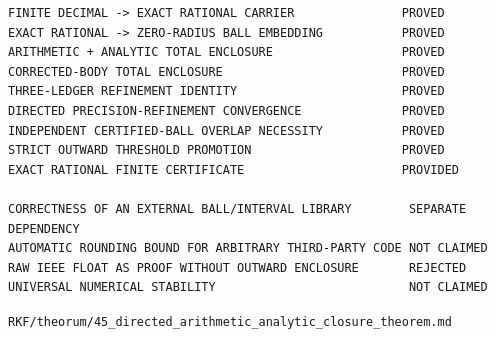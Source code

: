 \begin{verbatim}
FINITE DECIMAL -> EXACT RATIONAL CARRIER               PROVED
EXACT RATIONAL -> ZERO-RADIUS BALL EMBEDDING           PROVED
ARITHMETIC + ANALYTIC TOTAL ENCLOSURE                  PROVED
CORRECTED-BODY TOTAL ENCLOSURE                         PROVED
THREE-LEDGER REFINEMENT IDENTITY                       PROVED
DIRECTED PRECISION-REFINEMENT CONVERGENCE              PROVED
INDEPENDENT CERTIFIED-BALL OVERLAP NECESSITY           PROVED
STRICT OUTWARD THRESHOLD PROMOTION                     PROVED
EXACT RATIONAL FINITE CERTIFICATE                      PROVIDED

CORRECTNESS OF AN EXTERNAL BALL/INTERVAL LIBRARY        SEPARATE DEPENDENCY
AUTOMATIC ROUNDING BOUND FOR ARBITRARY THIRD-PARTY CODE NOT CLAIMED
RAW IEEE FLOAT AS PROOF WITHOUT OUTWARD ENCLOSURE       REJECTED
UNIVERSAL NUMERICAL STABILITY                           NOT CLAIMED
\end{verbatim}

\begin{flushright}\small\texttt{RKF/theorum/45\_directed\_arithmetic\_analytic\_closure\_theorem.md}\end{flushright}
